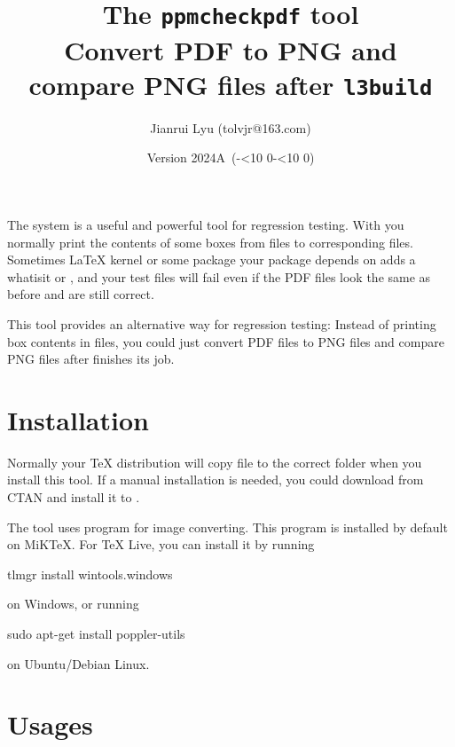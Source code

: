 \documentclass[oneside,12pt]{article}
\newcommand*{\myversion}{2024A}
\newcommand*{\mydate}{Version \myversion\ (\the\year-\mylpad\month-\mylpad\day)}
\newcommand*{\mylpad}[1]{\ifnum#1<10 0\the#1\else\the#1\fi}
\begin{document}
\title{\sffamily
  \textcolor{green3}{The \texttt{ppmcheckpdf} tool}\\
  {\large Convert PDF to PNG and compare PNG files after \texttt{l3build}}%
}
\author{%
  Jianrui Lyu (tolvjr@163.com)%
}
\date{\mydate}
\maketitle

The  system is a useful and powerful tool for regression testing.
With  you normally print the contents of some boxes from  files
to corresponding  files. Sometimes \LaTeX{} kernel or some package your package
depends on adds a whatisit or \mycmd{\kern0pt}, and your test files will fail even if
the PDF files look the same as before and are still correct.

This  tool provides an alternative way for regression testing:
Instead of printing box contents in  files, you could just convert PDF files
to PNG files and compare PNG files after  finishes its job.

\section{Installation}

Normally your TeX distribution will copy  file to the correct folder
when you install this tool. If a manual installation is needed, you could download
\href{https://ctan.org/pkg/ppmcheckpdf}{}
from CTAN and install it to .

The  tool uses  program for image converting.
This program is installed by default on MiKTeX. For TeX Live, you can install it by running
\begin{codehigh}
tlmgr install wintools.windows
\end{codehigh}
on Windows, or running
\begin{codehigh}
sudo apt-get install poppler-utils
\end{codehigh}
on Ubuntu/Debian Linux.

\section{Usages}
\end{document}
